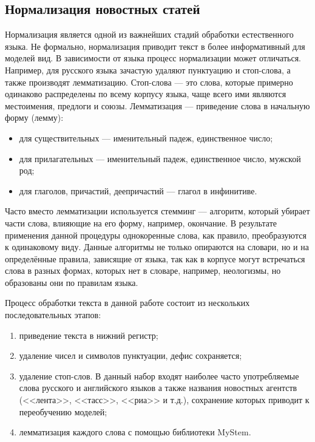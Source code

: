 \documentclass[a4paper, 14pt]{extarticle}
\begin{document}
\subsection{Нормализация новостных статей}
Нормализация является одной из важнейших стадий обработки естественного языка. Не формально, нормализация приводит текст в 
более информативный для моделей вид. В зависимости от языка процесс нормализации может отличаться. Например, для русского языка
зачастую удаляют пунктуацию и стоп-слова, а также производят лемматизацию. Стоп-слова --- это слова, которые примерно 
одинаково распределены по всему корпусу языка, чаще всего ими являются местоимения, предлоги и союзы. Лемматизация --- 
приведение слова в начальную форму (лемму):
\begin{itemize}
	\item для существительных --- именительный падеж, единственное число;
	\item для прилагательных --- именительный падеж, единственное число, мужской род;
	\item для глаголов, причастий, деепричастий --- глагол в инфинитиве.
\end{itemize}

Часто вместо лемматизации используется стемминг --- алгоритм, который убирает части 
слова, влияющие на его форму, например, окончание. В результате применения данной процедуры однокоренные слова, как правило,
преобразуются к одинаковому виду. Данные алгоритмы не только опираются на словари, но и на 
определённые правила, зависящие от языка, так как в корпусе могут встречаться слова в разных формах, которых нет в 
словаре, например, неологизмы, но образованы они по правилам языка.

Процесс обработки текста в данной работе состоит из нескольких последовательных этапов:
\begin{enumerate}
	\item приведение текста в нижний регистр;
	\item удаление чисел и символов пунктуации, дефис сохраняется;
	\item удаление стоп-слов. В данный набор входят наиболее часто употребляемые слова русского и английского языков
	а также названия новостных агентств (<<лента>>, <<тасс>>, <<риа>> и т.д.), сохранение которых приводит к 
	переобучению моделей;
	\item лемматизация каждого слова с помощью библиотеки MyStem\cite{mystem}.
\end{enumerate}
\end{document}
